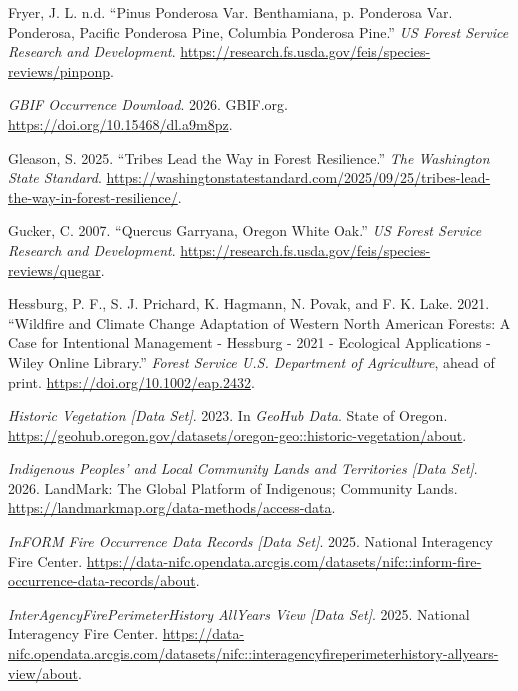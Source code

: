 \documentclass[
  letterpaper,
  DIV=11,
  numbers=noendperiod]{scrartcl}
\newlength{\cslhangindent}
\newenvironment{CSLReferences}[2] %
 {\begin{list}{}{%
  \setlength{\itemindent}{0pt}
  \setlength{\leftmargin}{0pt}
  \setlength{\parsep}{0pt}
  \ifodd #1
   \setlength{\leftmargin}{\cslhangindent}
   \setlength{\itemindent}{-1\cslhangindent}
  \fi
  \setlength{\itemsep}{#2\baselineskip}}}
 {\end{list}}
\begin{document}
\begin{CSLReferences}{1}{1}
Fryer, J. L. n.d. {``Pinus Ponderosa Var. Benthamiana, p. Ponderosa Var.
Ponderosa, Pacific Ponderosa Pine, Columbia Ponderosa Pine.''} \emph{US
Forest Service Research and Development}.
\url{https://research.fs.usda.gov/feis/species-reviews/pinponp}.

\emph{GBIF Occurrence Download}. 2026. GBIF.org.
\url{https://doi.org/10.15468/dl.a9m8pz}.

Gleason, S. 2025. {``Tribes Lead the Way in Forest Resilience.''}
\emph{The Washington State Standard}.
\url{https://washingtonstatestandard.com/2025/09/25/tribes-lead-the-way-in-forest-resilience/}.

Gucker, C. 2007. {``Quercus Garryana, Oregon White Oak.''} \emph{US
Forest Service Research and Development}.
\url{https://research.fs.usda.gov/feis/species-reviews/quegar}.

Hessburg, P. F., S. J. Prichard, K. Hagmann, N. Povak, and F. K. Lake.
2021. {``Wildfire and Climate Change Adaptation of Western North
American Forests: A Case for Intentional Management - Hessburg - 2021 -
Ecological Applications - Wiley Online Library.''} \emph{Forest Service
U.S. Department of Agriculture}, ahead of print.
\url{https://doi.org/10.1002/eap.2432}.

\emph{Historic Vegetation {[}Data Set{]}}. 2023. In \emph{GeoHub Data}.
State of Oregon.
\url{https://geohub.oregon.gov/datasets/oregon-geo::historic-vegetation/about}.

\emph{Indigenous Peoples' and Local Community Lands and Territories
{[}Data Set{]}}. 2026. LandMark: The Global Platform of Indigenous;
Community Lands. \url{https://landmarkmap.org/data-methods/access-data}.

\emph{InFORM Fire Occurrence Data Records {[}Data Set{]}}. 2025.
National Interagency Fire Center.
\url{https://data-nifc.opendata.arcgis.com/datasets/nifc::inform-fire-occurrence-data-records/about}.

\emph{InterAgencyFirePerimeterHistory AllYears View {[}Data Set{]}}.
2025. National Interagency Fire Center.
\url{https://data-nifc.opendata.arcgis.com/datasets/nifc::interagencyfireperimeterhistory-allyears-view/about}.


\end{CSLReferences}
\end{document}
